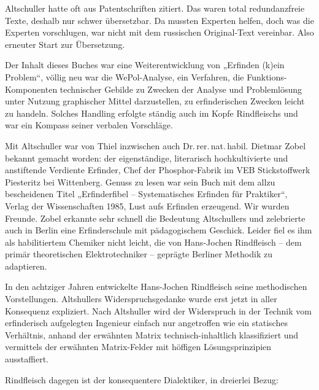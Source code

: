 \documentclass[12pt,a4paper]{article}
\begin{document}
Altschuller hatte oft aus Patentschriften zitiert. Das waren total
redundanzfreie Texte, deshalb nur schwer übersetzbar. Da mussten Experten
helfen, doch was die Experten vorschlugen, war nicht mit dem russischen
Original-Text vereinbar. Also erneuter Start zur Übersetzung.

Der Inhalt dieses Buches war eine Weiterentwicklung von „Erfinden (k)ein
Problem“, völlig neu war die WePol-Analyse, ein Verfahren, die
Funktions-Komponenten technischer Gebilde zu Zwecken der Analyse und
Problemlösung unter Nutzung graphischer Mittel darzustellen, zu erfinderischen
Zwecken leicht zu handeln. Solches Handling erfolgte ständig auch im Kopfe
Rindfleischs und war ein Kompass seiner verbalen Vorschläge.

Mit Altschuller war von Thiel inzwischen auch Dr.\,rer.\,nat.\,habil. Dietmar
Zobel bekannt gemacht worden: der eigenständige, literarisch hochkultivierte
und anstiftende Verdiente Erfinder, Chef der Phosphor-Fabrik im VEB
Stickstoffwerk Piesteritz bei Wittenberg. Genuss zu lesen war sein Buch mit dem
allzu bescheidenen Titel „Erfinderfibel – Systematisches Erfinden für
Praktiker“, Verlag der Wissenschaften 1985, Lust aufs Erfinden erzeugend. Wir
wurden Freunde. Zobel erkannte sehr schnell die Bedeutung Altschullers und
zelebrierte auch in Berlin eine Erfinderschule mit pädagogischem Geschick.
Leider fiel es ihm als habilitiertem Chemiker nicht leicht, die von Hans-Jochen
Rindfleisch – dem primär theoretischen Elektrotechniker -- geprägte Berliner
Methodik zu adaptieren.

In den achtziger Jahren entwickelte Hans-Jochen Rindfleisch seine methodischen
Vorstellungen. Altshullers Widerspruchsgedanke wurde erst jetzt in aller
Konsequenz expliziert. Nach Altshuller wird der Widerspruch in der Technik vom
erfinderisch aufgelegten Ingenieur einfach nur angetroffen wie ein statisches
Verhältnis, anhand der erwähnten Matrix technisch-inhaltlich klassifiziert und
vermittels der erwähnten Matrix-Felder mit höffigen Lösungsprinzipien
ausstaffiert.

Rindfleisch dagegen ist der konsequentere Dialektiker, in dreierlei Bezug:
\end{document}
